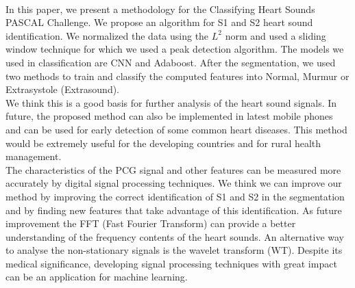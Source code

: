 \documentclass[11pt, a4papper]{report}
\theoremstyle{plain}
\theoremstyle{definition}
\theoremstyle{definition}
\theoremstyle{proposition}
\begin{document}
\

In this paper, we present a methodology for the Classifying Heart Sounds PASCAL Challenge. We propose an algorithm for S1 and S2 heart sound identification. We normalized the data using the $L^2$ norm and used a sliding window technique for which we used a peak detection algorithm. The models we used in classification are CNN and Adaboost. After the segmentation, we used two methods to train and classify the computed features into Normal, Murmur or Extrasystole (Extrasound).
\\

We think this is a good basis for further analysis of the heart sound signals. In future, the proposed method can also be implemented in latest mobile phones and can be used for early detection of some common heart diseases. This method would be extremely useful for the developing countries and for rural health management.
\\

The characteristics of the PCG signal and other features can be measured more accurately by digital signal processing techniques. We think we can improve our method by improving the correct identification of S1 and S2 in the segmentation and by finding new features that take advantage of this identification. As future improvement the FFT (Fast Fourier Transform) can provide a better understanding of the frequency contents of the heart sounds. An alternative way to analyse the non-stationary signals is the wavelet transform (WT). Despite its medical significance, developing signal processing techniques with great impact can be an application for machine learning.

\end{document}
